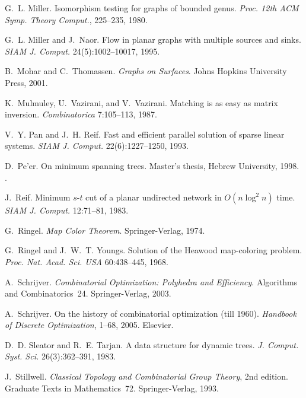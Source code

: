 \begin{thebibliography}{10}
\balancecolumns
\itemsep 1.5pt

G.~L. Miller.
\newblock Isomorphism testing for graphs of bounded genus.
\newblock \emph{Proc. 12th ACM Symp. Theory Comput.}, 225--235, 1980.

G.~L. Miller and J.~Naor.
\newblock Flow in planar graphs with multiple sources and sinks.
\newblock \emph{SIAM J. Comput.} 24(5):1002--10017, 1995.

B.~Mohar and C.~Thomassen.
\newblock \emph{Graphs on Surfaces}.
\newblock Johns Hopkins University Press, 2001.

K.~Mulmuley, U.~Vazirani, and V.~Vazirani.
\newblock Matching is as easy as matrix inversion.
\newblock \emph{Combinatorica} 7:105--113, 1987.

V.~Y. Pan and J.~H. Reif.
\newblock Fast and efficient parallel solution of sparse linear systems.
\newblock \emph{SIAM J. Comput.} 22(6):1227--1250, 1993.

D.~Pe'er.
\newblock On minimum spanning trees.
\newblock Master's thesis, Hebrew University, 1998.
\newblock {}.

J.~Reif.
\newblock Minimum $s$-$t$ cut of a planar undirected network in {$O(n\log^2
  n)$} time.
\newblock \emph{SIAM J. Comput.} 12:71--81, 1983.

G.~Ringel.
\newblock \emph{Map Color Theorem}.
\newblock Springer-Verlag, 1974.

G.~Ringel and J.~W.~T. Youngs.
\newblock Solution of the {Heawood} map-coloring problem.
\newblock \emph{Proc. Nat. Acad. Sci. USA} 60:438--445, 1968.

A.~Schrijver.
\newblock \emph{Combinatorial Optimization: Polyhedra and Efficiency}.
\newblock Algorithms and Combinatorics~24. Springer-Verlag, 2003.

A.~Schrijver.
\newblock On the history of combinatorial optimization (till 1960).
\newblock \emph{Handbook of Discrete Optimization}, 1--68, 2005. Elsevier.

D.~D. Sleator and R.~E. Tarjan.
\newblock A data structure for dynamic trees.
\newblock \emph{J. Comput. Syst. Sci.} 26(3):362--391, 1983.

J.~Stillwell.
\newblock \emph{Classical Topology and Combinatorial Group Theory}, 2nd
  edition.
\newblock Graduate Texts in Mathematics~72. Springer-Verlag, 1993.


\end{thebibliography}
